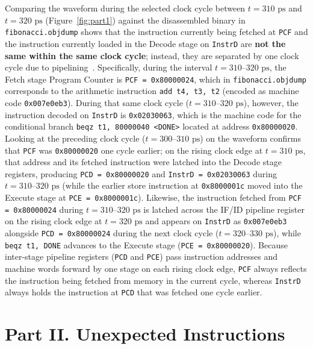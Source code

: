 \documentclass[11pt,a4paper]{article}
\begin{document}
Comparing the waveform during the selected clock cycle between $t = 310\text{ ps}$ and $t = 320\text{ ps}$ (Figure~\ref{fig:part1}) against the disassembled binary in \texttt{fibonacci.objdump} shows that the instruction currently being fetched at \texttt{PCF} and the instruction currently loaded in the Decode stage on \texttt{InstrD} are \textbf{not the same within the same clock cycle}; instead, they are separated by one clock cycle due to pipelining~\cite{harris2021}. Specifically, during the interval $t = 310\text{--}320\text{ ps}$, the Fetch stage Program Counter is \texttt{PCF = 0x80000024}, which in \texttt{fibonacci.objdump} corresponds to the arithmetic instruction \texttt{add t4, t3, t2} (encoded as machine code \texttt{0x007e0eb3}). During that same clock cycle ($t = 310\text{--}320\text{ ps}$), however, the instruction decoded on \texttt{InstrD} is \texttt{0x02030063}, which is the machine code for the conditional branch \texttt{beqz t1, 80000040 <DONE>} located at address \texttt{0x80000020}. Looking at the preceding clock cycle ($t = 300\text{--}310\text{ ps}$) on the waveform confirms that \texttt{PCF} was \texttt{0x80000020} one cycle earlier; on the rising clock edge at $t = 310\text{ ps}$, that address and its fetched instruction were latched into the Decode stage registers, producing \texttt{PCD = 0x80000020} and \texttt{InstrD = 0x02030063} during $t = 310\text{--}320\text{ ps}$ (while the earlier store instruction at \texttt{0x8000001c} moved into the Execute stage at \texttt{PCE = 0x8000001c}). Likewise, the instruction fetched from \texttt{PCF = 0x80000024} during $t = 310\text{--}320\text{ ps}$ is latched across the IF/ID pipeline register on the rising clock edge at $t = 320\text{ ps}$ and appears on \texttt{InstrD} as \texttt{0x007e0eb3} alongside \texttt{PCD = 0x80000024} during the next clock cycle ($t = 320\text{--}330\text{ ps}$), while \texttt{beqz t1, DONE} advances to the Execute stage (\texttt{PCE = 0x80000020}). Because inter-stage pipeline registers (\texttt{PCD} and \texttt{PCE}) pass instruction addresses and machine words forward by one stage on each rising clock edge, \texttt{PCF} always reflects the instruction being fetched from memory in the current cycle, whereas \texttt{InstrD} always holds the instruction at \texttt{PCD} that was fetched one cycle earlier.


\section{Part II. Unexpected Instructions}
\end{document}

